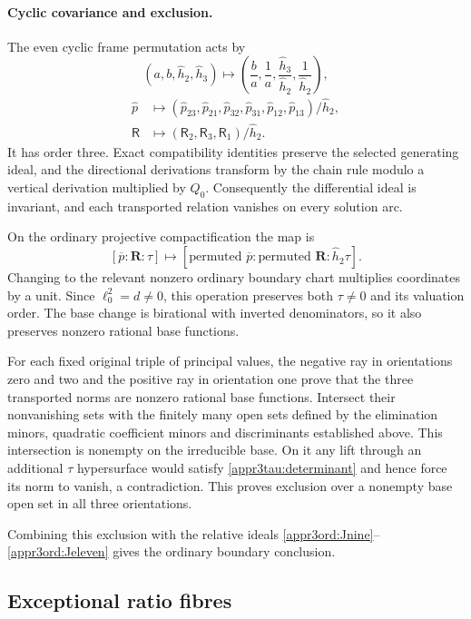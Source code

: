 \documentclass[11pt,a4paper]{article}
\numberwithin{equation}{section}
\theoremstyle{plain}
\theoremstyle{definition}
\theoremstyle{remark}
\begin{document}
\paragraph{Cyclic covariance and exclusion.}
The even cyclic frame permutation acts by
\[
 (a,b,\widehat h_2 ,\widehat h_3 )\longmapsto
 \left(\frac ba,\frac1a,\frac{\widehat h_3}{\widehat h_2},\frac{1}{\widehat h_2}\right),
\]
\[
 \begin{aligned}
 \widehat p&\longmapsto
   (\widehat p_{23},\widehat p_{21},\widehat p_{32},\widehat p_{31},\widehat p_{12},\widehat p_{13})/\widehat h_2 ,\\
 \mathsf R&\longmapsto(\mathsf R_2,\mathsf R_3,\mathsf R_1)/\widehat h_2 .
 \end{aligned}
\]
It has order three.  Exact compatibility identities preserve the selected
generating ideal, and the directional derivations transform by the
chain rule modulo a vertical derivation multiplied by $Q_0$.
Consequently the differential ideal is invariant, and each
transported relation vanishes on every solution arc.

On the ordinary projective compactification the map is
\[
 [\overline p:\boldsymbol R:\tau]\longmapsto
   [\text{permuted }\overline p:\text{permuted }\boldsymbol R:\widehat h_2 \tau].
\]
Changing to the relevant nonzero ordinary boundary chart multiplies coordinates
by a unit.  Since $\ell_0^2=d\ne0$, this operation preserves both
$\tau\ne0$ and its valuation order.  The base change is birational
with inverted denominators, so it also preserves nonzero rational
base functions.

For each fixed original triple of principal values, the negative ray in orientations
zero and two and the positive ray in orientation one prove that the
three transported norms are nonzero rational base functions.
Intersect their nonvanishing sets with the finitely many open sets defined by the elimination minors,
quadratic coefficient minors and discriminants established above.  This
intersection is nonempty on the irreducible base.  On it any lift
through an additional $\tau$ hypersurface would satisfy
\eqref{appr3tau:determinant} and hence force its norm to vanish, a
contradiction.  This proves exclusion over a nonempty base open set in
all three orientations.

Combining this exclusion with the relative ideals
\eqref{appr3ord:Jnine}--\eqref{appr3ord:Jeleven} gives the ordinary
boundary conclusion.

\subsection{Exceptional ratio fibres}
\label{appr3fib:scope}
\end{document}
